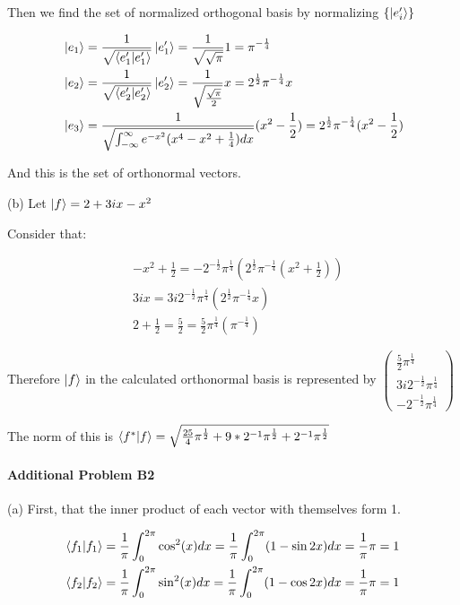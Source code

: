 \documentclass{article}
\begin{document}
Then we find the set of normalized orthogonal basis by normalizing $\{\ket{e'_i}\}$

\begin{align*}
&\ket{e_1} = \frac{1}{\sqrt{\bra{e'_1}\ket{e'_1}}} \ket{e'_1} = \frac{1}{\sqrt{\sqrt{\pi}}} 1 = \pi^{-\frac{1}{4}} \\
&\ket{e_2} = \frac{1}{\sqrt{\bra{e'_2}\ket{e'_2}}} \ket{e'_2} = \frac{1}{\sqrt{\frac{\sqrt{\pi}}{2}}} x = 2^{\frac{1}{2}} \pi^{-\frac{1}{4}} x \\
&\ket{e_3} = \frac{1}{\sqrt{\int_{-\infty}^{\infty} e^{-x^2} (x^4 - x^2+ \frac{1}{4}) dx}} (x^2 - \frac{1}{2}) = 2^{\frac{1}{2}} \pi^{-\frac{1}{4}}  (x^2 - \frac{1}{2})
\end{align*}

And this is the set of orthonormal vectors.

(b) Let $\ket{f} = 2 + 3ix - x^2$

Consider that:

\begin{align*}
&-x^2 + \frac{1}{2}  = - 2^{-\frac{1}{2}}\pi^{\frac{1}{4}} (2^{\frac{1}{2}} \pi^{-\frac{1}{4}}(x^2 + \frac{1}{2}))\\
&3ix = 3i 2^{-\frac{1}{2}} \pi^{\frac{1}{4}}  (2^{\frac{1}{2}} \pi^{-\frac{1}{4}} x) \\
&2 + \frac{1}{2} = \frac{5}{2} = \frac{5}{2} \pi^{\frac{1}{4}} (\pi^{-\frac{1}{4}})
\end{align*}

Therefore $\ket{f}$ in the calculated orthonormal basis is represented by $\begin{pmatrix}
\frac{5}{2} \pi^{\frac{1}{4}} \\ 3i 2^{-\frac{1}{2}} \pi^{\frac{1}{4}} \\ - 2^{-\frac{1}{2}}\pi^{\frac{1}{4}}
\end{pmatrix}$

The norm of this is $\bra{f^{*}}\ket{f} = \sqrt{\frac{25}{4} \pi^{\frac{1}{2}} + 9*2^{-1} \pi^{\frac{1}{2}} + 2^{-1}\pi^{\frac{1}{2}}}$

\paragraph{Additional Problem B2}

(a) 	
First, that the inner product of each vector with themselves form 1.

\begin{align*}
\bra{f_1}\ket{f_1} = \frac{1}{\pi} \int_{0}^{2\pi} \cos^2(x)dx = \frac{1}{\pi} \int_{0}^{2\pi} (1-\sin 2x ) dx= \frac{1}{\pi} \pi = 1\\
\bra{f_2}\ket{f_2} = \frac{1}{\pi} \int_{0}^{2\pi} \sin^2(x)dx = \frac{1}{\pi} \int_{0}^{2\pi} (1-\cos 2x ) dx=  \frac{1}{\pi} \pi = 1
\end{align*}
\end{document}
